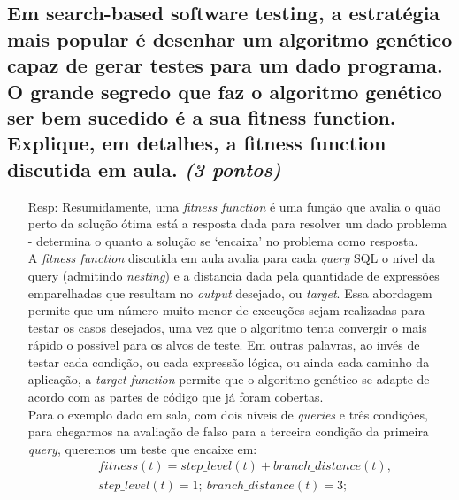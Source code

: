 \documentclass[paper=a4, fontsize=11pt]{scrartcl} %
\numberwithin{equation}{section} %
\numberwithin{figure}{section} %
\numberwithin{table}{section} %
\begin{document}
\subsection{Em search-based software testing, a estratégia mais popular é desenhar um algoritmo genético capaz de gerar testes para um dado programa. O grande segredo que faz o algoritmo genético ser bem sucedido é a sua fitness function. Explique, em detalhes, a fitness function discutida em aula. \textit{(3 pontos)}}
    \begin{itemize}
        \item[Resp:] Resumidamente, uma \textit{fitness function} é uma função que avalia o quão perto da solução ótima está a resposta dada para resolver um dado problema - determina o quanto a solução se `encaixa' no problema como resposta.\\
        A \textit{fitness function} discutida em aula avalia para cada \textit{query} SQL o nível da query (admitindo \textit{nesting}) e a distancia dada pela quantidade de expressões emparelhadas que resultam no \textit{output} desejado, ou \textit{target}. Essa abordagem permite que um número muito menor de execuções sejam realizadas para testar os casos desejados, uma vez que o algoritmo tenta convergir o mais rápido o possível para os alvos de teste. Em outras palavras, ao invés de testar cada condição, ou cada expressão lógica, ou ainda cada caminho da aplicação, a \textit{target function} permite que o algoritmo genético se adapte de acordo com as partes de código que já foram cobertas.\\
        Para o exemplo dado em sala, com dois níveis de \textit{queries} e três condições, para chegarmos na avaliação de falso para a terceira condição da primeira \textit{query}, queremos um teste que encaixe em:
        \begin{align*}
           & fitness(t)=step\_level(t)+branch\_distance(t),\\
           & step\_level(t)=1;\ branch\_distance(t)=3;
        \end{align*}         
    \end{itemize}
\end{document}
